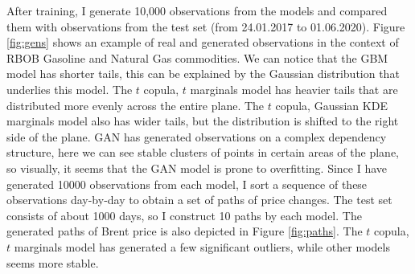 \documentclass{article}
\begin{document}
After training, I generate 10,000 observations from the models and compared them with observations from the test set (from 24.01.2017 to 01.06.2020). Figure \ref{fig:gens} shows an example of real and generated observations in the context of RBOB Gasoline and Natural Gas commodities. We can notice that the GBM model has shorter tails, this can be explained by the Gaussian distribution that underlies this model. The $t$ copula, $t$ marginals model has heavier tails that are distributed more evenly across the entire plane. The $t$ copula, Gaussian KDE marginals model also has wider tails, but the distribution is shifted to the right side of the plane. GAN has generated observations on a complex dependency structure, here we can see stable clusters of points in certain areas of the plane, so visually, it seems that the GAN model is prone to overfitting. Since I have generated 10000 observations from each model, I sort a sequence of these observations day-by-day to obtain a set of paths of price changes. The test set consists of about 1000 days, so I construct 10 paths by each model. The generated paths of Brent price is also depicted in Figure \ref{fig:paths}. The $t$ copula, $t$ marginals model has generated a few significant outliers, while other models seems more stable.
\end{document}

